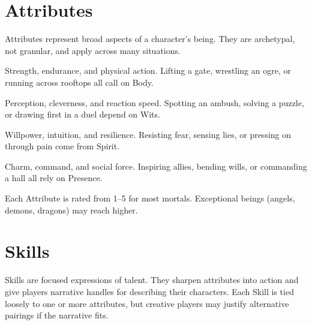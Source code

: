\documentclass[12pt]{article}
\begin{document}
\section{Attributes}
Attributes represent broad aspects of a character’s being. They are archetypal, not granular, and apply across many situations.  

\begin{description}[leftmargin=2cm]
  \item[Body] Strength, endurance, and physical action. Lifting a gate, wrestling an ogre, or running across rooftops all call on Body.  
  \item[Wits] Perception, cleverness, and reaction speed. Spotting an ambush, solving a puzzle, or drawing first in a duel depend on Wits.  
  \item[Spirit] Willpower, intuition, and resilience. Resisting fear, sensing lies, or pressing on through pain come from Spirit.  
  \item[Presence] Charm, command, and social force. Inspiring allies, bending wills, or commanding a hall all rely on Presence.  
\end{description}

Each Attribute is rated from 1–5 for most mortals. Exceptional beings (angels, demons, dragons) may reach higher.  

\section{Skills}
Skills are focused expressions of talent. They sharpen attributes into action and give players narrative handles for describing their characters. Each Skill is tied loosely to one or more attributes, but creative players may justify alternative pairings if the narrative fits.
\end{document}
